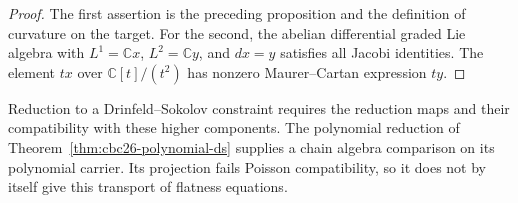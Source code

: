 \begin{proof}
The first assertion is the preceding proposition and the definition of curvature on the target.
For the second, the abelian differential graded Lie algebra with $L^1=\mathbb Cx$, $L^2=\mathbb Cy$, and $dx=y$ satisfies all Jacobi identities.
The element $tx$ over $\mathbb C[t]/(t^2)$ has nonzero Maurer--Cartan expression $ty$.
\end{proof}

Reduction to a Drinfeld--Sokolov constraint requires the reduction maps and their compatibility with these higher components.
The polynomial reduction of Theorem~\ref{thm:cbc26-polynomial-ds} supplies a chain algebra comparison on its polynomial carrier.
Its projection fails Poisson compatibility, so it does not by itself give this transport of flatness equations.

